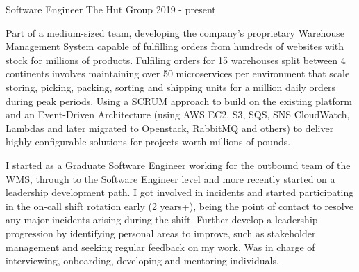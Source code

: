 \cventry
    {Software Engineer} %
    {The Hut Group} %
    {} %
    {2019 - present} %
    {\begin{cvitems}
        \item{Part of a medium-sized team, developing the company's proprietary Warehouse Management System 
        capable of fulfilling orders from hundreds of websites with stock for millions of products. Fulfiling 
        orders for 15 warehouses split between 4 continents involves maintaining over 50 microservices per environment
        that scale storing, picking, packing, sorting and shipping units for a million daily orders during peak 
        periods. Using a SCRUM approach to build on the existing platform and an Event-Driven Architecture 
        (using AWS EC2, S3, SQS, SNS CloudWatch, Lambdas and later migrated to Openstack, RabbitMQ and others) 
        to deliver highly configurable solutions for projects worth millions of pounds.}
        \item{I started as a Graduate Software Engineer working for the outbound team of the WMS, through to the 
        Software Engineer level and more recently started on a leadership development path. I got involved in 
        incidents and started participating in the on-call shift rotation early (2 years+), being the point of 
        contact to resolve any major incidents arising during the shift. Further develop a leadership progression 
        by identifying personal areas to improve, such as stakeholder management and seeking regular feedback on 
        my work. Was in charge of interviewing, onboarding, developing and mentoring individuals.}
    \end{cvitems}}
